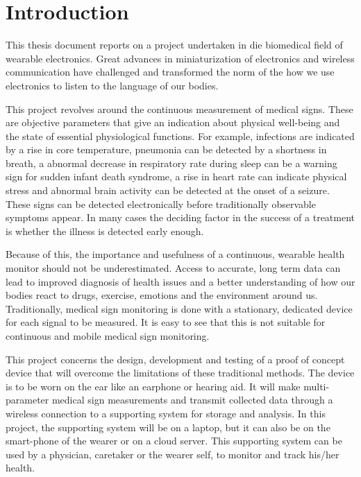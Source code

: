 \chapter{Introduction}
\label{chp:Introduction}
This thesis document reports on a project undertaken in die biomedical field of wearable electronics. Great advances in miniaturization of electronics and wireless communication have challenged and transformed the norm of the how we use electronics to listen to the language of our bodies.

\medskip
This project revolves around the continuous measurement of medical signs. These are objective parameters that give an indication about physical well-being and the state of essential physiological functions. For example, infections are indicated by a rise in core temperature, pneumonia can be detected by a shortness in breath, a abnormal decrease in respiratory rate during sleep can be a warning sign for sudden infant death syndrome, a rise in heart rate can indicate physical stress and abnormal brain activity can be detected at the onset of a seizure. These signs can be detected electronically before traditionally observable symptoms appear. In many cases the deciding factor in the success of a treatment is whether the illness is detected early enough.

\medskip
Because of this, the importance and usefulness of a continuous, wearable health monitor should not be underestimated. Access to accurate, long term data can lead to improved diagnosis of health issues and a better understanding of how our bodies react to drugs, exercise, emotions and the environment around us. Traditionally, medical sign monitoring is done with a stationary, dedicated device for each signal to be measured. It is easy to see that this is not suitable for continuous and mobile medical sign monitoring.

\medskip
This project concerns the design, development and testing of a proof of concept device that will overcome the limitations of these traditional methods. The device is to be worn on the ear like an earphone or hearing aid. It will make multi-parameter medical sign measurements and transmit collected data through a wireless connection to a supporting system for storage and analysis. In this project, the supporting system will be on a laptop, but it can also be on the smart-phone of the wearer or on a cloud server. This supporting system can be used by a physician, caretaker or the wearer self, to monitor and track his/her health.

